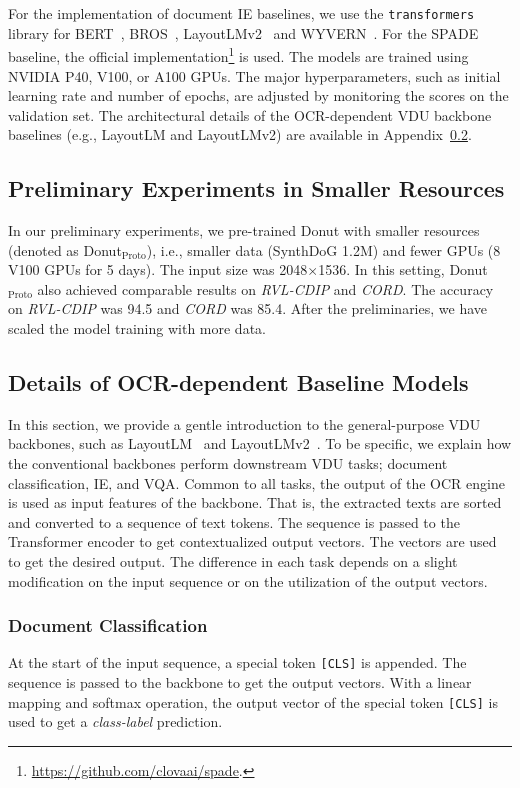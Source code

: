 \documentclass[runningheads]{llncs}
\newcommand\ours{{{\mbox{Donut}}}\xspace}
\begin{document}
For the implementation of document IE baselines, we use the \texttt{transformers} library for BERT~\cite{devlinBERT2018}, BROS~\cite{hong2021bros}, LayoutLMv2~\cite{xu-etal-2021-layoutlmv2,layoutxlm} and WYVERN~\cite{hwang2021costeffective}.
For the SPADE~\cite{hwang-etal-2021-spatial} baseline, the official implementation\footnote{\url{https://github.com/clovaai/spade}.} is used.
The models are trained using NVIDIA P40, V100, or A100 GPUs. The major hyperparameters, such as initial learning rate and number of epochs, are adjusted by monitoring the scores on the validation set. The architectural details of the OCR-dependent VDU backbone baselines (e.g., LayoutLM and LayoutLMv2) are available in Appendix~\ref{sec:detail_of_VDU_backbone}.

\subsection{Preliminary Experiments in Smaller Resources}\label{sec:smaller_resources}
In our preliminary experiments, we pre-trained \ours with smaller resources (denoted as Donut$_{\text{Proto}}$), i.e., smaller data (SynthDoG 1.2M) and fewer GPUs (8 V100 GPUs for 5 days). The input size was 2048$\times$1536. In this setting, Donut$_{\text{Proto}}$ also achieved comparable results on \textit{RVL-CDIP} and \textit{CORD}. The accuracy on \textit{RVL-CDIP} was 94.5 and \textit{CORD} was 85.4.
After the preliminaries, we have scaled the model training with more data.

\subsection{Details of OCR-dependent Baseline Models}\label{sec:detail_of_VDU_backbone}
In this section, we provide a gentle introduction to the general-purpose VDU backbones, such as LayoutLM~\cite{xu2019_layoutLM} and LayoutLMv2~\cite{xu-etal-2021-layoutlmv2}.
To be specific, we explain how the conventional backbones perform downstream VDU tasks; document classification, IE, and VQA.
Common to all tasks, the output of the OCR engine is used as input features of the backbone.
That is, the extracted texts are sorted and converted to a sequence of text tokens. The sequence is passed to the Transformer encoder to get contextualized output vectors.
The vectors are used to get the desired output.
The difference in each task depends on a slight modification on the input sequence or on the utilization of the output vectors.

\subsubsection{Document Classification}
At the start of the input sequence, a special token \texttt{[CLS]} is appended.
The sequence is passed to the backbone to get the output vectors.
With a linear mapping and softmax operation, the output vector of the special token \texttt{[CLS]} is used to get a \textit{class-label} prediction.
\end{document}

